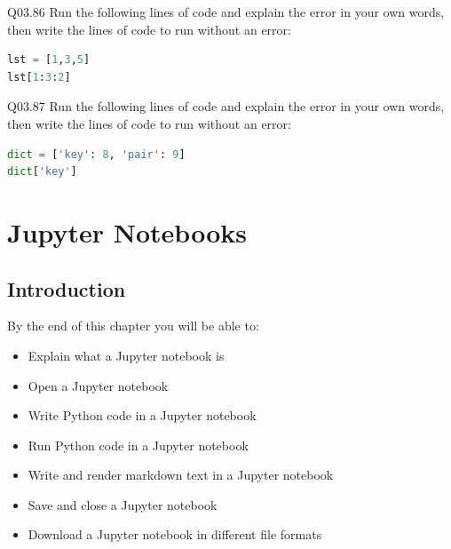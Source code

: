 \documentclass{book}
\newenvironment{problems}{}{}  %
\begin{document}
\begin{problems}
Q03.86 Run the following lines of code and explain the error in your own
words, then write the lines of code to run without an error:

\begin{lstlisting}[language=Python]
lst = [1,3,5]
lst[1:3:2]
\end{lstlisting}

Q03.87 Run the following lines of code and explain the error in your own
words, then write the lines of code to run without an error:

\begin{lstlisting}[language=Python]
dict = ['key': 8, 'pair': 9]
dict['key']
\end{lstlisting}
        \end{problems}

    




    
        \chapter{Jupyter Notebooks}\label{jupyter-notebooks}
    




    
        \section{Introduction}\label{introduction}
    




    
        By the end of this chapter you will be able to:

\begin{itemize}
\item
  Explain what a Jupyter notebook is
\item
  Open a Jupyter notebook
\item
  Write Python code in a Jupyter notebook
\item
  Run Python code in a Jupyter notebook
\item
  Write and render markdown text in a Jupyter notebook
\item
  Save and close a Jupyter notebook
\item
  Download a Jupyter notebook in different file formats
\end{itemize}
        \newpage



    
\end{document}
